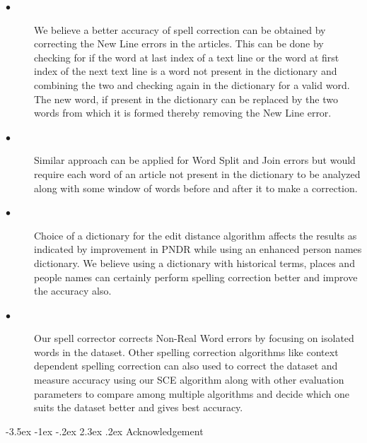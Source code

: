 \documentclass[12pt]{article}
\makeatletter
\renewcommand\section{\@startsection{section}{1}{\z@}%
                                  {-3.5ex \@plus -1ex \@minus -.2ex}%
                                  {2.3ex \@plus.2ex}%
                                  {\normalfont\bfseries}}
\makeatother
\begin{document}
\begin{description}
\item[$\bullet$]\noindent
We believe a better accuracy of spell correction can be obtained by correcting the New Line errors in the articles. This can be done by checking for if the word at last index of a text line or the word at first index of the next text line is a word not present in the dictionary and combining the two and checking again in the dictionary for a valid word. The new word, if present in the dictionary can be replaced by the two words from which it is formed thereby removing the New Line error. 
\item[$\bullet$]\noindent Similar approach can be applied for Word Split and Join errors but would require each word of an article not present in the dictionary to be analyzed along with some window of words before and after it to make a correction. 
\item[$\bullet$]\noindent Choice of a dictionary for the edit distance algorithm affects the results as indicated by improvement in PNDR while using an enhanced person names dictionary. We believe using a dictionary with historical terms, places and people names can certainly perform spelling correction better and improve the accuracy also.
\item[$\bullet$] \noindent 
Our spell corrector corrects Non-Real Word errors by focusing on isolated words in the dataset. Other spelling correction algorithms like context dependent spelling correction can also used to correct the dataset and measure accuracy using our SCE algorithm along with other evaluation parameters to compare among multiple algorithms and decide which one suits the dataset better and gives best accuracy. 
\end{description}



\section{Acknowledgement}


\end{document}
